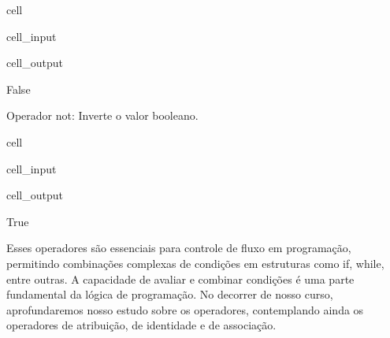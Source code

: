 \documentclass[letterpaper,10pt,english]{jupyterBook}
\begin{document}
\begin{sphinxuseclass}{cell}\begin{sphinxVerbatimInput}

\begin{sphinxuseclass}{cell_input}
\begin{sphinxVerbatim}[commandchars=\\\{\}]
       
\end{sphinxVerbatim}

\end{sphinxuseclass}\end{sphinxVerbatimInput}
\begin{sphinxVerbatimOutput}

\begin{sphinxuseclass}{cell_output}
\begin{sphinxVerbatim}[commandchars=\\\{\}]
False
\end{sphinxVerbatim}

\end{sphinxuseclass}\end{sphinxVerbatimOutput}

\end{sphinxuseclass}
\sphinxAtStartPar
Operador not: Inverte o valor booleano.

\begin{sphinxuseclass}{cell}\begin{sphinxVerbatimInput}

\begin{sphinxuseclass}{cell_input}
\begin{sphinxVerbatim}[commandchars=\\\{\}]
      
\end{sphinxVerbatim}

\end{sphinxuseclass}\end{sphinxVerbatimInput}
\begin{sphinxVerbatimOutput}

\begin{sphinxuseclass}{cell_output}
\begin{sphinxVerbatim}[commandchars=\\\{\}]
True
\end{sphinxVerbatim}

\end{sphinxuseclass}\end{sphinxVerbatimOutput}

\end{sphinxuseclass}
\sphinxAtStartPar
Esses operadores são essenciais para controle de fluxo em programação, permitindo combinações complexas de condições em estruturas como if, while, entre outras. A capacidade de avaliar e combinar condições é uma parte fundamental da lógica de programação. No decorrer de nosso curso, aprofundaremos nosso estudo sobre os operadores, contemplando ainda os operadores de atribuição, de identidade e de associação.
\end{document}
